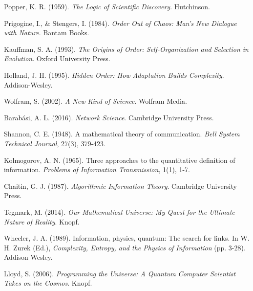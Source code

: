 \documentclass[12pt]{article}
\begin{document}
\begin{thebibliography}{99}
 Popper, K. R. (1959). \textit{The Logic of Scientific Discovery}. Hutchinson.

 Prigogine, I., \& Stengers, I. (1984). \textit{Order Out of Chaos: Man's New Dialogue with Nature}. Bantam Books.

 Kauffman, S. A. (1993). \textit{The Origins of Order: Self-Organization and Selection in Evolution}. Oxford University Press.

 Holland, J. H. (1995). \textit{Hidden Order: How Adaptation Builds Complexity}. Addison-Wesley.

 Wolfram, S. (2002). \textit{A New Kind of Science}. Wolfram Media.

 Barabási, A. L. (2016). \textit{Network Science}. Cambridge University Press.

 Shannon, C. E. (1948). A mathematical theory of communication. \textit{Bell System Technical Journal}, 27(3), 379-423.

 Kolmogorov, A. N. (1965). Three approaches to the quantitative definition of information. \textit{Problems of Information Transmission}, 1(1), 1-7.

 Chaitin, G. J. (1987). \textit{Algorithmic Information Theory}. Cambridge University Press.

 Tegmark, M. (2014). \textit{Our Mathematical Universe: My Quest for the Ultimate Nature of Reality}. Knopf.

 Wheeler, J. A. (1989). Information, physics, quantum: The search for links. In W. H. Zurek (Ed.), \textit{Complexity, Entropy, and the Physics of Information} (pp. 3-28). Addison-Wesley.

 Lloyd, S. (2006). \textit{Programming the Universe: A Quantum Computer Scientist Takes on the Cosmos}. Knopf.

\end{thebibliography}
\end{document}
